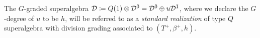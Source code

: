 \begin{defi}\label{def:standard-realization-Q}
    The $G$-graded superalgebra $\mathcal{D} \coloneqq Q(1) \otimes \mathcal{D}^{\bar0} = \mathcal{D}^{\bar0} \oplus u\mathcal{D}^{\bar1}$, where we declare the $G$-degree of $u$ to be $h$, will be referred to as a \emph{standard realization} of type $Q$ superalgebra with division grading associated to $(T^+, \beta^+, h)$.
\end{defi}


    



